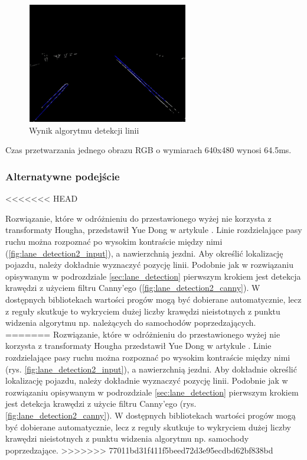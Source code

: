 \begin{figure}
  \centering
  \includegraphics[width=7cm]{img/prehough.png}
  \caption{Wynik algorytmu detekcji linii\cite{T3}}
  \label{fig:result}
\end{figure}

Czas przetwarzania jednego obrazu RGB o wymiarach 640x480 wynosi 64.5ms.

\subsubsection{Alternatywne podejście}
<<<<<<< HEAD

Rozwiązanie, które w odróżnieniu do przestawionego wyżej nie korzysta z transformaty Hougha, przedstawił Yue Dong w artykule \cite{T6}.
Linie rozdzielające pasy ruchu można rozpoznać po wysokim kontraście między nimi (\ref{fig:lane_detection2_input}), a nawierzchnią jezdni. 
Aby określić lokalizację pojazdu, należy dokładnie wyznaczyć pozycję linii. 
Podobnie jak w rozwiązaniu opisywanym w podrozdziale \ref{sec:lane_detection} pierwszym krokiem jest detekcja krawędzi z użyciem filtru Canny'ego (\ref{fig:lane_detection2_canny}). 
W dostępnych bibliotekach wartości progów mogą być dobierane automatycznie, lecz z reguły skutkuje to wykryciem dużej liczby krawędzi nieistotnych z punktu widzenia algorytmu np. należących do samochodów poprzedzających.
=======
Rozwiązanie, które w odróżnieniu do przestawionego wyżej nie korzysta z transformaty Hougha przedstawił Yue Dong w artykule \cite{T6}.
Linie rozdzielające pasy ruchu można rozpoznać po wysokim kontraście między nimi (rys. \ref{fig:lane_detection2_input}), a nawierzchnią jezdni. Aby dokładnie określić lokalizację pojazdu, należy dokładnie wyznaczyć pozycję linii. 
Podobnie jak w rozwiązaniu opisywanym w podrozdziale \ref{sec:lane_detection} pierwszym krokiem jest detekcja krawędzi z użycie filtru Canny'ego (rys. \ref{fig:lane_detection2_canny}). W dostępnych bibliotekach wartości progów mogą być dobierane automatycznie, lecz z reguły skutkuje to wykryciem dużej liczby krawędzi nieistotnych z punktu widzenia algorytmu np. samochody poprzedzające.
>>>>>>> 77011bd31f411f5beed72d3e95ecdbd62bf838bd

